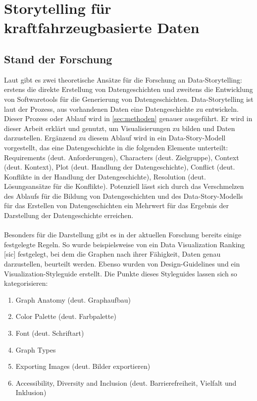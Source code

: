 \chapter{Storytelling für kraftfahrzeugbasierte Daten}
\section{Stand der Forschung}
Laut \cite{Daradkeh.2023} gibt es zwei theoretische Ansätze für die Forschung an Data-Storytelling: erstens die direkte Erstellung von Datengeschichten und zweitens die Entwicklung von Softwaretools für die Generierung von Datengeschichten. Data-Storytelling ist laut \cite{Daradkeh.2023} der Prozess, aus vorhandenen Daten eine Datengeschichte zu entwickeln. Dieser Prozess oder Ablauf wird in \ref{sec:methoden} genauer ausgeführt. Er wird in dieser Arbeit erklärt und genutzt, um Visualisierungen zu bilden und Daten darzustellen. Ergänzend zu diesem Ablauf wird in \cite{Daradkeh.2023} ein Data-Story-Modell vorgestellt, das eine Datengeschichte in die folgenden Elemente unterteilt: Requirements (deut. Anforderungen), Characters (deut. Zielgruppe), Context (deut. Kontext), Plot (deut. Handlung der Datengeschichte), Conflict (deut. Konflikte in der Handlung der Datengeschichte), Resolution (deut. Lösungsansätze für die Konflikte). Potenziell lässt sich durch das Verschmelzen des Ablaufs für die Bildung von Datengeschichten und des Data-Story-Modells für das Erstellen von Datengeschichten ein Mehrwert für das  Ergebnis der Darstellung der Datengeschichte erreichen.
\\\\Besonders für die Darstellung gibt es in der aktuellen Forschung bereits einige festgelegte Regeln. So wurde beispielsweise von \cite{Schwabish.2021} ein \glqq Data Visualization Ranking [sic]\grqq{} festgelegt, bei dem die Graphen nach ihrer Fähigkeit, Daten genau darzustellen, beurteilt werden. Ebenso wurden von \cite{Schwabish.2021} Design-Guidelines und ein Visualization-Styleguide erstellt. Die Punkte dieses Styleguides lassen sich so kategorisieren: 
\begin{enumerate}
    \item Graph Anatomy (deut. Graphaufbau)
    \item Color Palette (deut. Farbpalette)
    \item Font (deut. Schriftart)
    \item Graph Types
    \item Exporting Images (deut. Bilder exportieren)
    \item Accessibility, Diversity and Inclusion (deut. Barrierefreiheit, Vielfalt und Inklusion)
\end{enumerate}
